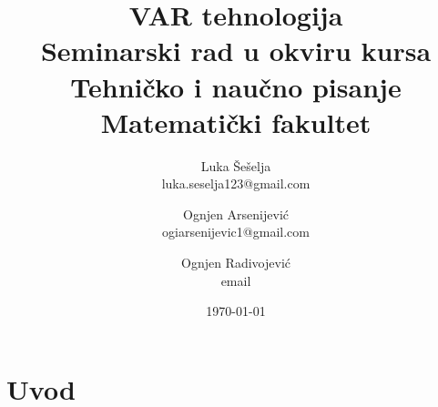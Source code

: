\documentclass[12pt,a4paper]{article}
\begin{document}
\title{VAR tehnologija\\ \small{Seminarski rad u okviru kursa\\Tehničko i naučno pisanje\\ Matematički fakultet}}

\author{Luka Šešelja\\ luka.seselja123@gmail.com \and Ognjen Arsenijević\\ ogiarsenijevic1@gmail.com \and Ognjen Radivojević\\ email}
\date{\today}
\maketitle

\begin{abstract}
    
\end{abstract}

\tableofcontents

\newpage

\section{Uvod}
\label{sec:uvod}
\end{document}
